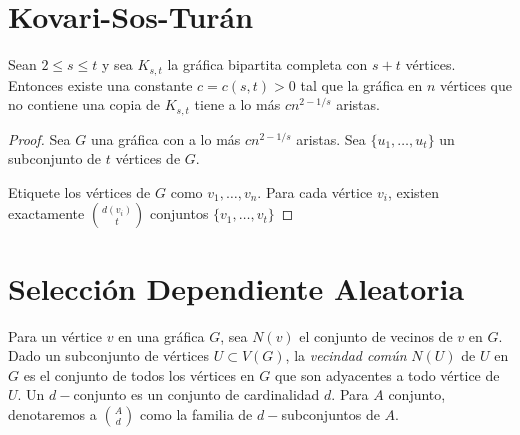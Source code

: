 \section{Kovari-Sos-Turán}

\begin{theorem}
  Sean $2 \leq s \leq t$ y sea $K_{s,t}$ la gráfica bipartita
  completa con $s + t$ vértices. Entonces existe una constante $c =
  c(s, t) > 0$ tal que
  la gráfica en $n$ vértices que no contiene una copia de $K_{s, t}$
  tiene a lo más
  $c n^{2 - 1/s}$ aristas.
\end{theorem}
\begin{proof}
  Sea $G$ una gráfica con a lo más $cn^{2 - 1/s}$ aristas.
  Sea $\{u_1, \ldots, u_t\}$ un subconjunto de $t$ vértices de $G$.

  Etiquete
  los vértices de $G$ como $v_1, \ldots, v_n$. Para cada vértice
  $v_i$, existen exactamente $\binom{d(v_i)}{t}$ conjuntos $\{v_1,
  \ldots, v_t\}$
\end{proof}

\section{Selección Dependiente Aleatoria}
Para un vértice $v$ en una gráfica $G$, sea $N(v)$ el conjunto de
vecinos de $v$ en $G$. Dado un subconjunto de vértices $U \subset
V(G)$, la \textit{vecindad común} $N(U)$ de $U$ en $G$ es el conjunto
de todos los vértices en $G$ que son adyacentes a todo vértice de $U$.
Un $d-$conjunto es un conjunto de cardinalidad $d$. Para $A$
conjunto, denotaremos a $\binom{A}{d}$ como la familia de
$d-$subconjuntos de $A$.

